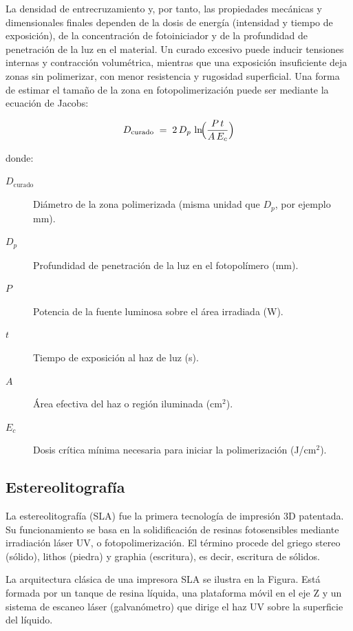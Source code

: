 La densidad de entrecruzamiento y, por tanto, las propiedades mecánicas y dimensionales finales dependen de la dosis de energía (intensidad y tiempo de exposición), de la concentración de fotoiniciador y de la profundidad de penetración de la luz en el material. Un curado excesivo puede inducir tensiones internas y contracción volumétrica, mientras que una exposición insuficiente deja zonas sin polimerizar, con menor resistencia y rugosidad superficial. Una forma de estimar el tamaño de la zona en fotopolimerización puede ser mediante la ecuación de Jacobs:

\begin{equation}
	D_{\mathrm{curado}} \;=\; 2\,D_{p}\,\ln\!\Bigl(\frac{P\,t}{A\,E_{c}}\Bigr)
\end{equation}

donde:

\begin{description}
	\item[$D_{\mathrm{curado}}$] Diámetro de la zona polimerizada (misma unidad que $D_{p}$, por ejemplo mm).
	\item[$D_{p}$] Profundidad de penetración de la luz en el fotopolímero (mm).
	\item[$P$] Potencia de la fuente luminosa sobre el área irradiada (W).
	\item[$t$] Tiempo de exposición al haz de luz (s).
	\item[$A$] Área efectiva del haz o región iluminada (cm$^2$).
	\item[$E_{c}$] Dosis crítica mínima necesaria para iniciar la polimerización (J/cm$^2$).
\end{description}


\subsection{Estereolitografía}

La estereolitografía (SLA) fue la primera tecnología de impresión 3D patentada. Su funcionamiento se basa en la solidificación de resinas fotosensibles mediante irradiación láser UV, o fotopolimerización. El término procede del griego stereo (sólido), lithos (piedra) y graphia (escritura), es decir, escritura de sólidos.

La arquitectura clásica de una impresora SLA se ilustra en la Figura. Está formada por un tanque de resina líquida, una plataforma móvil en el eje Z y un sistema de escaneo láser (galvanómetro) que dirige el haz UV sobre la superficie del líquido.

